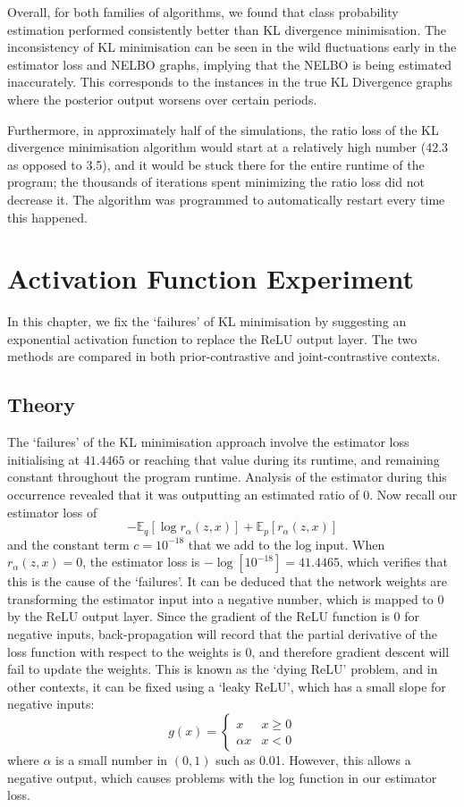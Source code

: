 \documentclass[honours,12pt]{unswthesis}
\newcommand{\E}{\mathbb{E}}
\numberwithin{equation}{section}
\theoremstyle{definition}
\begin{document}
Overall, for both families of algorithms, we found that class probability estimation performed consistently better than KL divergence minimisation. The inconsistency of KL minimisation can be seen in the wild fluctuations early in the estimator loss and NELBO graphs, implying that the NELBO is being estimated inaccurately. This corresponds to the instances in the true KL Divergence graphs where the posterior output worsens over certain periods.

Furthermore, in approximately half of the simulations, the ratio loss of the KL divergence minimisation algorithm would start at a relatively high number (42.3 as opposed to 3.5), and it would be stuck there for the entire runtime of the program; the thousands of iterations spent minimizing the ratio loss did not decrease it. The algorithm was programmed to automatically restart every time this happened.
\newpage
\chapter{Activation Function Experiment}
In this chapter, we fix the `failures' of KL minimisation by suggesting an exponential activation function to replace the ReLU output layer. The two methods are compared in both prior-contrastive and joint-contrastive contexts.
\section{Theory}
The `failures' of the KL minimisation approach involve the estimator loss initialising at $41.4465$ or reaching that value during its runtime, and remaining constant throughout the program runtime. Analysis of the estimator during this occurrence revealed that it was outputting an estimated ratio of $0$. Now recall our estimator loss of
\[-\E_q[\log r_\alpha(z,x)]+\E_p[r_\alpha(z,x)]\]
and the constant term $c=10^{-18}$ that we add to the log input. When $r_\alpha(z,x)=0$, the estimator loss is $-\log [10^{-18}]=41.4465$, which verifies that this is the cause of the `failures'. It can be deduced that the network weights are transforming the estimator input into a negative number, which is mapped to $0$ by the ReLU output layer. Since the gradient of the ReLU function is $0$ for negative inputs, back-propagation will record that the partial derivative of the loss function with respect to the weights is $0$, and therefore gradient descent will fail to update the weights. This is known as the `dying ReLU' problem, and in other contexts, it can be fixed using a `leaky ReLU', which has a small slope for negative inputs\citep{leaky}:
\[g(x)=\begin{cases}x & x\geq 0\\ \alpha x & x<0
\end{cases}\]
where $\alpha$ is a small number in $(0,1)$ such as 0.01. However, this allows a negative output, which causes problems with the log function in our estimator loss.
\end{document}
